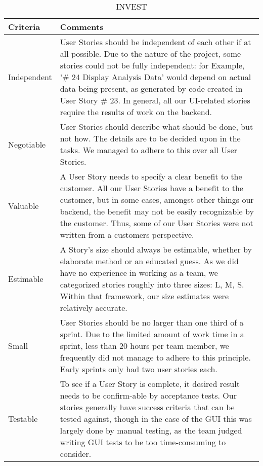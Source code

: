 \begin{table}[h!]
  \caption{INVEST}
  \label{INVEST}
  \centering
  \begin{tabular}{|p{3cm} | p{11cm}|}
	\hline  	 
  	 Criteria & Comments \\ 
  	 \hline
  	 \hline
  	Independent & User Stories should be independent of each other if at all possible. Due to the nature of the project, some stories could not be fully independent: for Example, '\# 24 Display Analysis Data' would depend on actual data being present, as generated by code created in User Story \# 23. In general, all our UI-related stories require the results of work on the backend.  \\ 
  	\hline
  	 Negotiable & User Stories should describe what should be done, but not how. The details are to be decided upon in the tasks. We managed to adhere to this over all User Stories.  \\ 
  	\hline
  	Valuable & A User Story needs to specify a clear benefit to the customer. All our User Stories have a benefit to the customer, but in some cases, amongst other things our backend, the benefit may not be easily recognizable by the customer. Thus, some of our User Stories were not written from a customers perspective. \\ 
  	\hline
  	Estimable & A Story's size should always be estimable, whether by elaborate method or an educated guess. As we did have no experience in working as a team, we categorized stories roughly into three sizes: L, M, S.  Within that framework, our size estimates were relatively accurate.   \\ 
  	\hline
  	Small & User Stories should be no larger than one third of a sprint. Due to the limited amount of work time in a sprint, less than 20 hours per team member, we frequently did not manage to adhere to this principle. Early sprints only had two user stories each.  \\ 
  	\hline
  	Testable & To see if a User Story is complete, it desired result needs to be confirm-able by acceptance tests. Our stories generally have success criteria that can be tested against, though in the case of the GUI this was largely done by manual testing, as the team judged writing GUI tests to be too time-consuming to consider. \\ 
  	\hline
  \end{tabular}
\end{table}

\newpage

